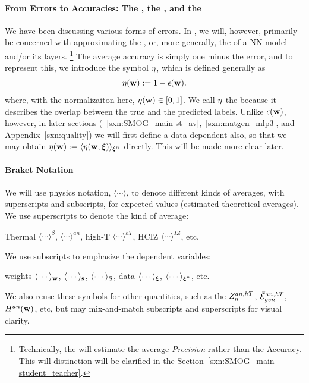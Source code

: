 \paragraph{From Errors to Accuracies: The \AverageGeneralizationAccuracy, the \Quality, and the \SelfOverlap}
We have been discussing various forms of errors.
In \SETOL, we will, however, primarily be concerned with approximating the \emph{\AverageGeneralizationAccuracy},
or, more generally, the \Quality of a NN model and/or its layers.
\footnote{Technically, the \Quality will estimate the average \emph{Precision} rather than the Accuracy.
This will distinction will be clarified in the Section~\ref{sxn:SMOG_main-student_teacher}.}
The average accuracy is simply one minus the error, and to represent this,
we introduce the symbol $\eta$, which is defined generally as
\begin{align}
 \label{eqn:def_eta}
 \eta({\mathbf{w}}) := 1-\epsilon({\mathbf{w}}).
\end{align}
where, with the normalizaiton here, $\eta({\mathbf{w}})\in[0,1]$.
We call $\eta$ the \emph{\SelfOverlap} because it describes the overlap between the true and the predicted labels.
Unlike $\epsilon({\mathbf{w}})$, however, in later sections
(~\ref{sxn:SMOG_main-st_av},~\ref{sxn:matgen_mlp3}, and Appendix~\ref{sxn:quality})
we will first define a data-dependent \SelfOverlap also, so that we may obtain
 $\eta({\mathbf{w}}):=\langle\eta({\mathbf{w}},\boldsymbol{\xi})\rangle_{\boldsymbol{\xi}^{n}}$ directly.
This will be made more clear later.

\paragraph{Braket Notation}
We will use physics \BraKet notation, $\langle\cdots\rangle$,
to denote different kinds of averages, with superscripts and subscripts,
for expected values (estimated theoretical averages).
We use superscripts to denote the kind of average:
\begin{center}
Thermal $\langle\cdots\rangle^{\beta}$,
\Annealed $\langle\cdots\rangle^{an}$,
high-T $\langle\cdots\rangle^{hT}$,
HCIZ $\langle\cdots\rangle^{IZ}$, etc.
\end{center}
We use subscripts to emphasize the dependent variables:
\begin{center}
  weights $\langle\cdots\rangle_{{\mathbf{w}}}$, $\langle\cdots\rangle_{{\mathbf{s}}}$, $\langle\cdots\rangle_{{\mathbf{S}}}$,
data $\langle\cdots\rangle_{\boldsymbol{\xi}}$, $\langle\cdots\rangle_{\boldsymbol{\xi}^{n}}$, etc.
\end{center}
We also reuse these symbols for other quantities, such as the $Z^{an,hT}_{n}$, $\bar{\mathcal{E}}_{gen}^{an,hT}$, $H^{an}({\mathbf{w}})$, etc,
but may mix-and-match subscripts and superscripts for visual clarity.

